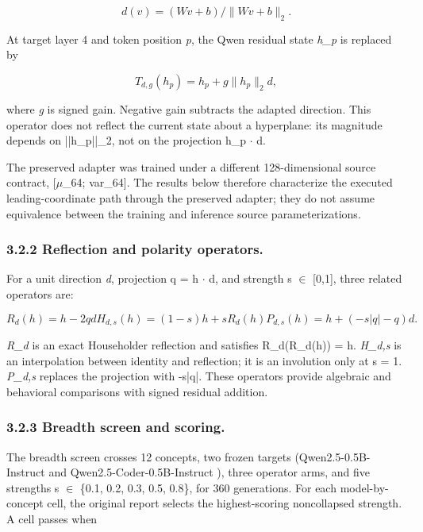 \documentclass[11pt]{article}
\begin{document}
\begin{equation*}
d(v) = (Wv + b) / \|Wv + b\|_2 .
\end{equation*}


At target layer 4 and token position \emph{p}, the Qwen residual state \emph{h\_p} is
replaced by

\begin{equation*}
T_{d,g}(h_p) = h_p + g \|h_p\|_2 d ,
\end{equation*}


where \emph{g} is signed gain. Negative gain subtracts the adapted direction. This
operator does not reflect the current state about a hyperplane: its magnitude
depends on ||h\_p||\_2, not on the projection h\_p $\cdot$ d.

The preserved adapter was trained under a different 128-dimensional source
contract, [$\mu$\_64; var\_64]. The results below therefore
characterize the executed leading-coordinate path through the preserved
adapter; they do not assume equivalence between the training and inference
source parameterizations.

\subsubsection*{3.2.2 Reflection and polarity operators.}


For a unit direction \emph{d}, projection q = h $\cdot$ d, and strength s $\in$ [0,1], three
related operators are:

\begin{equation*}
R_d(h)   = h - 2 q d
H_{d,s}(h) = (1-s)h + s R_d(h)
P_{d,s}(h) = h + (-s|q| - q)d .
\end{equation*}


\emph{R\_d} is an exact Householder reflection and satisfies R\_d(R\_d(h)) = h.
\emph{H\_d,s} is an interpolation between identity and reflection; it is an
involution only at s = 1. \emph{P\_d,s} replaces the projection with -s|q|. These
operators provide algebraic and behavioral comparisons with signed residual
addition.

\subsubsection*{3.2.3 Breadth screen and scoring.}


The breadth screen crosses 12 concepts, two frozen targets
(Qwen2.5-0.5B-Instruct and Qwen2.5-Coder-0.5B-Instruct \citep{qwen2024qwen25}), three operator arms,
and five strengths s $\in$ \{0.1, 0.2, 0.3, 0.5, 0.8\}, for 360 generations.
For each model-by-concept cell, the original report selects the highest-scoring
noncollapsed strength. A cell passes when
\end{document}
